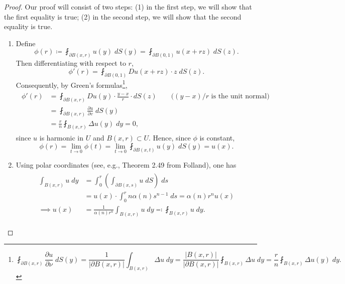 \documentclass{article}
\begin{document}
\begin{itemize}
		\begin{proof}
			Our proof will consist of two steps: (1) in the first step, we will show that the first equality is true; (2) in the second step, we will show that the second equality is true. 
			
			\begin{enumerate}[itemsep =-2pt,label = (\arabic{*})]
				\item Define 
				\begin{equation*}
					\phi(r) \coloneqq \fint_{\partial B(x, r)}u(y)\;dS(y) = \fint_{\partial B(0,1)}u(x + rz)\;dS(z). 
				\end{equation*}
				Then differentiating with respect to $r$, 
				\begin{equation*}
					\phi'(r) = \fint_{\partial B(0,1)}Du(x + rz) \cdot z\;dS(z). 
				\end{equation*}
				Consequently, by Green's formulas\footnote{
					
					\begin{equation*}
						\fint_{\partial B(x, r)}\frac{\partial u}{\partial \nu}\;dS(y) = \frac{1}{|\partial B(x, r)|}\int_{B(x,r)}\Delta u\;dy = \frac{|B(x, r)|}{|\partial B(x,r)|}\fint_{B(x, r)}\Delta u\;dy  = \frac{r}{n}\fint_{B(x, r)}\Delta u(y)\;dy. 
					\end{equation*}
				}, 
				\begin{align*}
					\begin{split}
						\phi'(r) &= \fint_{\partial B(x, r)}Du(y) \cdot \frac{y - x}{r}\cdot dS(z) \qquad (\text{$(y - x)/r$ is the unit normal)} \\
						&= \fint_{\partial B(x, r)}\frac{\partial u}{\partial v}\;dS(y) \\
						&= \frac{r}{n}\fint_{B(x, r)}\Delta u(y)\;dy = 0, 
					\end{split}
				\end{align*}
				since $u$ is harmonic in $U$ and $B(x, r) \subset U$. Hence, since $\phi$ is constant, 
				\begin{equation*}
					\phi(r) = \lim_{t \to 0}\phi(t) = \lim_{t \to 0}\fint_{\partial B(x, t)}u(y)\;dS(y) = u(x). 
				\end{equation*}
				\item Using polar coordinates (see, e.g., Theorem 2.49 from Folland), one has 
				\begin{align*}
					\begin{split}
						\int_{B(x, r)}u\;dy &= \int_{0}^{r}\left(\int_{\partial B(x, s)}u\;dS\right)\;ds \\
						&= u(x) \cdot \int_{0}^{r}n\alpha(n)s^{n-1}\;ds = \alpha(n)r^{n}u(x) \\
						\implies u(x) &= \frac{1}{\alpha(n)r^{n}}\int_{B(x, r)}u\;dy \eqqcolon \fint_{B(x, r)}u\;dy. 
					\end{split}
				\end{align*}
			\end{enumerate}
		\end{proof}
		

\end{itemize}
\end{document}
